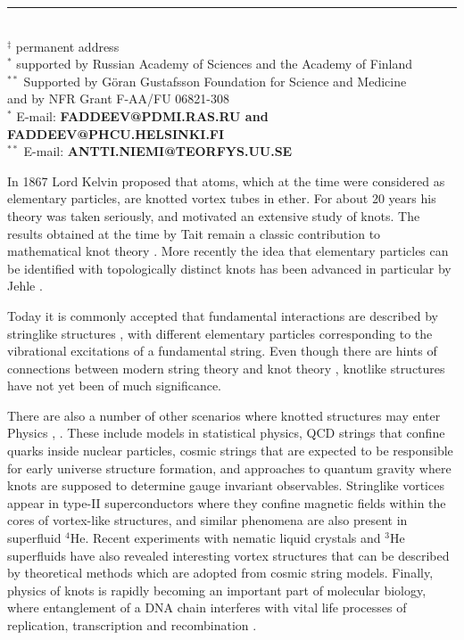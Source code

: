 \begin{titlepage}
\vfill
 
\begin{flushleft}
\rule{5.1 in}{.007 in} \\
$^{\ddagger}$  \small permanent address \\ \vskip 0.2cm
$^{*}$ \small supported by Russian Academy of Sciences
and the Academy of Finland \\ \vskip 0.2cm 
$^{**}$ \small Supported by G{\"o}ran Gustafsson
Foundation for Science and Medicine \\
\hskip 0.3cm and by NFR Grant F-AA/FU 06821-308
\\ \vskip 0.3cm
$^{*}$ \hskip 0.2cm {\small  E-mail: \scriptsize
\bf FADDEEV@PDMI.RAS.RU and FADDEEV@PHCU.HELSINKI.FI } \\
$^{**}$  {\small E-mail: \scriptsize
\bf ANTTI.NIEMI@TEORFYS.UU.SE}  \\
\end{flushleft}
 
 
\end{titlepage}
In 1867 Lord Kelvin \cite{kelvin} proposed
that atoms, which at the time were considered
as elementary particles, are knotted vortex 
tubes in ether. For about 
20 years his theory was taken seriously, and 
motivated an extensive study of 
knots. The results obtained at the time
by Tait \cite{tait} remain a 
classic contribution to mathematical
knot theory \cite{ati}. More recently the idea that 
elementary particles can be identified
with topologically distinct knots 
has been advanced in particular by Jehle \cite{jehle}.
 
Today it is commonly accepted that
fundamental interactions are
described by stringlike structures \cite{green},
with different elementary particles corresponding
to the vibrational excitations of a fundamental
string. Even though there are hints of
connections between modern string theory 
and knot theory \cite{witten},
knotlike structures have
not yet been of much 
significance.

There are also a number of other scenarios where
knotted structures may enter Physics 
\cite{ati}, \cite{rebbi}.
These include models in statistical physics,
QCD strings that confine
quarks inside nuclear particles,
cosmic strings that are expected
to be responsible for early universe structure formation,
and approaches to quantum gravity where knots
are supposed to determine gauge invariant observables.
Stringlike vortices appear in type-II superconductors 
where they confine magnetic fields within the cores of 
vortex-like structures, and  similar phenomena 
are also present in superfluid $^4$He.
Recent experiments with nematic liquid crystals
\cite{bowick} and $^3$He superfluids \cite{lou} 
have also revealed interesting vortex structures 
that can be described by theoretical methods 
which are adopted from cosmic string models. 
Finally, physics of knots
is rapidly becoming an important
part of molecular biology, 
where entanglement of a DNA chain interferes with 
vital life processes
of replication, transcription and 
recombination \cite{dna}.

